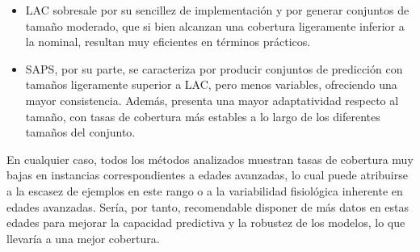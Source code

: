 \begin{itemize}

    \item LAC sobresale por su sencillez de implementación y por generar conjuntos de tamaño moderado, que si bien alcanzan una cobertura ligeramente inferior a la nominal, resultan muy eficientes en términos prácticos.
    
    \item SAPS, por su parte, se caracteriza por producir conjuntos de predicción con tamaños ligeramente superior a LAC, pero menos variables, ofreciendo una mayor consistencia. Además, presenta una mayor adaptatividad respecto al tamaño, con tasas de cobertura más estables a lo largo de los diferentes tamaños del conjunto. 
    
\end{itemize}

En cualquier caso, todos los métodos analizados muestran tasas de cobertura muy bajas en instancias correspondientes a edades avanzadas, lo cual puede atribuirse a la escasez de ejemplos en este rango o a la variabilidad fisiológica inherente en edades avanzadas. Sería, por tanto, recomendable disponer de más datos en estas edades para mejorar la capacidad predictiva y la robustez de los modelos, lo que llevaría a una mejor cobertura.








